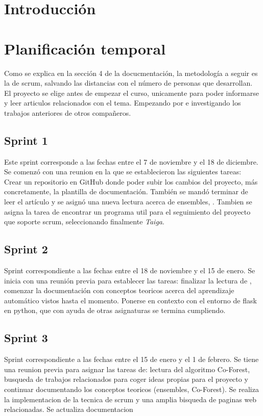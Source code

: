 
\section{Introducción}

\section{Planificación temporal}
Como se explica en la sección 4 de la docucmentación, la metodología a seguir es la de scrum, salvando las distancias con el número de personas que desarrollan.
El proyecto se elige antes de empezar el curso, unicamente para poder informarse y leer articulos relacionados con el tema. Empezando por \cite{Engelen:semi-supervised} e investigando los trabajos anteriores de otros compañeros.
\subsection{Sprint 1}
Este sprint corresponde a las fechas entre el 7 de noviembre y el 18 de diciembre. Se comenzó con una reunion en la que se establecieron las siguientes tareas:\\
Crear un repositorio en GitHub donde poder subir los cambios del proyecto, más concretamente, la plantilla de documentación. También se mandó terminar de leer el artículo \cite{Engelen:semi-supervised} y se asignó una nueva lectura acerca de ensembles, \cite{ensembles}.
Tambien se asigna la tarea de encontrar un programa util para el seguimiento del proyecto que soporte scrum, seleccionando finalmente \textit{Taiga}.
\subsection{Sprint 2}
Sprint correspondiente a las fechas entre el 18 de noviembre y el 15 de enero. Se inicia con una reunión previa para establecer las tareas: 
finalizar la lectura de \cite{ensembles}, comenzar la documentación con conceptos teoricos acerca del aprendizaje automático vistos hasta el momento. Ponerse en contexto con el entorno de flask en python, que con ayuda de otras asignaturas se termina cumpliendo.
\subsection{Sprint 3}
Sprint correspondiente a las fechas entre el 15 de enero y el 1 de febrero. Se tiene una reunion previa para asignar las tareas de: lectura del algoritmo Co-Forest, busqueda de trabajos relacionados para coger ideas propias para el proyecto y continuar documentando los conceptos teoricos (ensembles, Co-Forest). Se realiza la implementacion de la tecnica de scrum y una amplia bisqueda de paginas web relacionadas. Se actualiza documentacion

